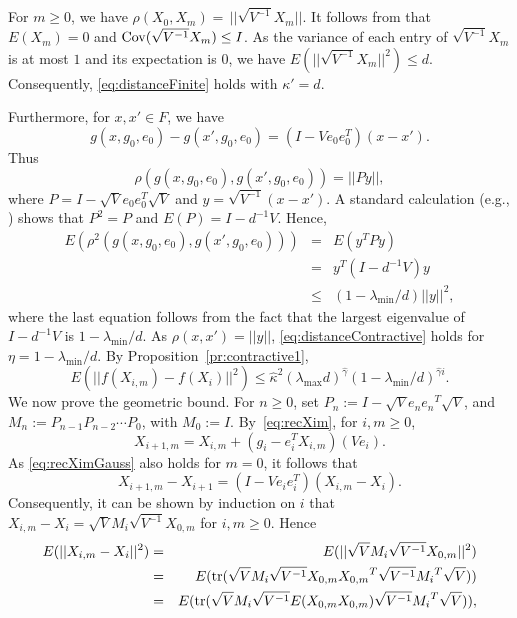 \documentclass[a4paper,11pt]{article}
\begin{document}
For \(m\ge0\), we have \(\rho(X_{0},X_{m})=\,||\sqrt{V^{-1}}X_{m}||\). It follows from   \cite[Lemma 2]{kahaleGaussian2019} that \(E(X_{m})=0\) and \({\rm Cov}(\sqrt{V^{-1}}X_{m})\leq I\). As the variance of each entry of \(\sqrt{V^{-1}}X_{m}\) is at most \(1\) and its expectation is \(0\), we have \(E(||\sqrt{V^{-1}}X_{m}||^{2})\leq d\). Consequently,  \eqref{eq:distanceFinite} holds with \(\kappa'=d\). 

Furthermore, for \(x,x'\in F\), we have
\begin{equation*}
g(x,g_{0},e_{0})-g(x',g_{0},e_{0})=(I-Ve_{0}e_{0}^{T})(x-x').
\end{equation*}Thus
\begin{equation*}
\rho(g(x,g_{0},e_{0}),g(x',g_{0},e_{0}))=||Py||,
\end{equation*}
where \(P=I-\sqrt{V}e_{0}e_{0}^{T}\sqrt{V}\) and \(y=\sqrt{V^{-1}}(x-x')\). A standard calculation (e.g., \citet{kahaleGaussian2019}) shows that \(P^{2}=P\) and \(E(P)=I-d^{-1}V\). Hence,\begin{eqnarray*}E(\rho^{2}(g(x,g_{0},e_{0}),g(x',g_{0},e_{0})))&=&E(y^{T}Py)\\
&=&y^{T}(I-d^{-1}V)y\\
&\le&(1-\lambda_{\min}/d)||y||^{2},
\end{eqnarray*}
 where the last equation follows from the fact that the largest eigenvalue of \(I-d^{-1}V\) is \(1-\lambda_{\min}/d\). As \(\rho(x,x')=||y||\), \eqref{eq:distanceContractive} holds for \(\eta=1-\lambda_{\min}/d\).
By Proposition~\ref{pr:contractive1}, \begin{equation*}
E(||f(X_{i,m})-f(X_{i})||^{2})\leq \hat\kappa^{2}(\lambda_{\max}d)^{\hat\gamma}(1-\lambda_{\min}/d)^{\hat\gamma i}.
\end{equation*}
We now prove the geometric bound. For \(n\geq0\), set  \(P_{n}:=I-\sqrt{V}e_{n}{e_{n}}^{T}\sqrt{V}\), and \(M_{n}:=P_{{n-1}}P_{{n-2}}\cdots P_{{0}}\), with \(M_{0}:=I\).  
 By~\eqref{eq:recXim}, for \(i,m\ge0\), \begin{equation}\label{eq:recXimGauss}
X_{i+1,m}=X_{i,m}+(g_{i}-e_{i}^{T}X_{i,m})(Ve_{i}).
\end{equation}As \eqref{eq:recXimGauss} also holds for \(m=0\), it follows that 
\begin{equation*}
X_{i+1,m}-X_{i+1}=(I-Ve_{i}e_{i}^{T})(X_{i,m}-X_{i}).
\end{equation*}
Consequently, it can be shown by induction on \(i\) that \(X_{i,m}-X_{i}=\sqrt{V}M_{i}\sqrt{V^{-1}}X_{0,m}\)  for \(i,m\ge0\). Hence 
\begin{eqnarray*} E(||X_{i,m}-X_{i}||^{2}) &=&E(||\sqrt{V}M_{i}\sqrt{V^{-1}}X_{0,m}||^{2})\\
&=&E({\rm tr}(\sqrt{V}M_{i}\sqrt{V^{-1}}X_{0,m}{X_{0,m}}^{T}\sqrt{V^{-1}}{M_{i}}^{T}\sqrt{V}))\\
&=&E({\rm tr}(\sqrt{V}M_{i}\sqrt{V^{-1}}E(X_{0,m}{X_{0,m}})\sqrt{V^{-1}}{M_{i}}^{T}\sqrt{V})),
\end{eqnarray*}
\end{document}
